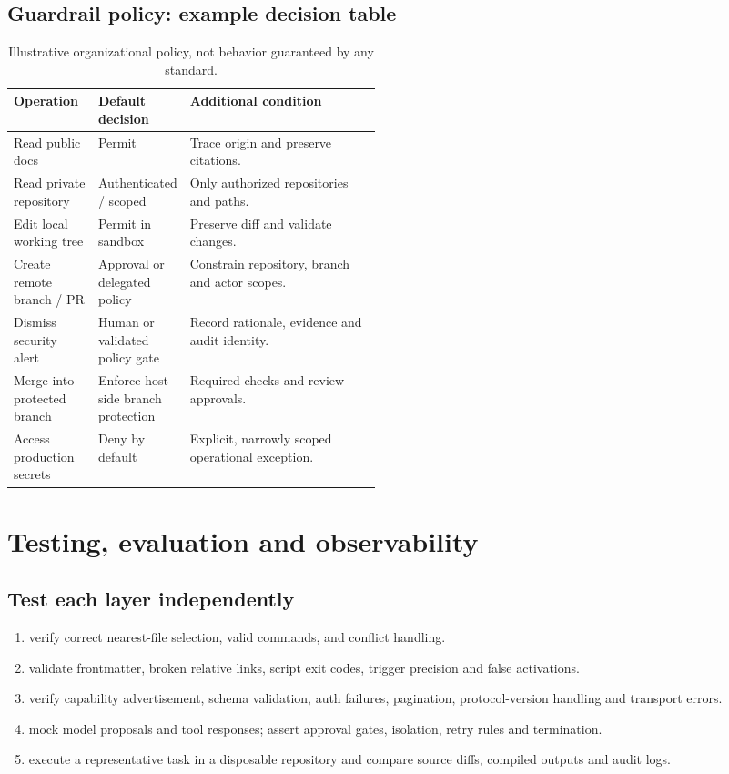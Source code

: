 \documentclass[11pt,letterpaper]{article}
\begin{document}
\subsection{Guardrail policy: example decision table}
\begin{table}[htbp]\centering\small
\begin{tabularx}{\linewidth}{@{}p{0.23\linewidth}p{0.24\linewidth}X@{}}
\toprule\textbf{Operation} & \textbf{Default decision} & \textbf{Additional condition}\\\midrule
Read public docs & Permit & Trace origin and preserve citations.\\
Read private repository & Authenticated / scoped & Only authorized repositories and paths.\\
Edit local working tree & Permit in sandbox & Preserve diff and validate changes.\\
Create remote branch / PR & Approval or delegated policy & Constrain repository, branch and actor scopes.\\
Dismiss security alert & Human or validated policy gate & Record rationale, evidence and audit identity.\\
Merge into protected branch & Enforce host-side branch protection & Required checks and review approvals.\\
Access production secrets & Deny by default & Explicit, narrowly scoped operational exception.\\\bottomrule
\end{tabularx}
\caption{Illustrative organizational policy, not behavior guaranteed by any standard.}
\end{table}

\section{Testing, evaluation and observability}\label{sec:evaluation}
\subsection{Test each layer independently}
\begin{enumerate}
\item {} verify correct nearest-file selection, valid commands, and conflict handling.
\item {} validate frontmatter, broken relative links, script exit codes, trigger precision and false activations.
\item {} verify capability advertisement, schema validation, auth failures, pagination, protocol-version handling and transport errors.
\item {} mock model proposals and tool responses; assert approval gates, isolation, retry rules and termination.
\item {} execute a representative task in a disposable repository and compare source diffs, compiled outputs and audit logs.
\end{enumerate}
\end{document}
